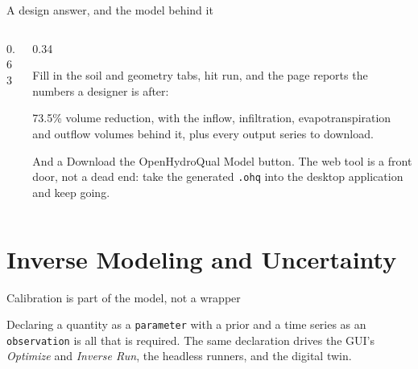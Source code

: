 \documentclass[aspectratio=169, 10pt]{beamer}
\begin{document}
\begin{frame}{A design answer, and the model behind it}
  \begin{columns}[c,onlytextwidth]
    \begin{column}{0.63\textwidth}
    \end{column}
    \begin{column}{0.34\textwidth}
      {\footnotesize Fill in the soil and geometry tabs, hit run, and the page
      reports the numbers a designer is after:

      \vspace{0.4em}
      \alert{73.5\% volume reduction}, with the inflow, infiltration,
      evapotranspiration and outflow volumes behind it, plus every output
      series to download.}
      \vspace{0.6em}

      {\scriptsize And a \alert{Download the OpenHydroQual Model} button. The
      web tool is a front door, not a dead end: take the generated
      \texttt{.ohq} into the desktop application and keep going.}
    \end{column}
  \end{columns}
\end{frame}

\section{Inverse Modeling and Uncertainty}

\begin{frame}{Calibration is part of the model, not a wrapper}

  \vspace{-0.4em}
  {\footnotesize Declaring a quantity as a \texttt{parameter} with a prior and a
  time series as an \texttt{observation} is all that is required. The same
  declaration drives the GUI's \emph{Optimize} and \emph{Inverse Run}, the
  headless runners, and the digital twin.}
\end{frame}
\end{document}
